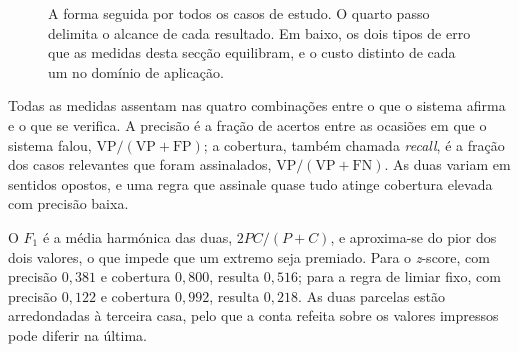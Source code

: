 \begin{figure}[htbp]
\centering
{}
\caption[A forma comum aos quatro casos de estudo]{A forma seguida por todos os casos de estudo. O
quarto passo delimita o alcance de cada resultado. Em baixo, os dois tipos de erro que as medidas
desta secção equilibram, e o custo distinto de cada um no domínio de aplicação.}
\label{fig:av_forma}
\end{figure}

Todas as medidas assentam nas quatro combinações entre o que o sistema afirma e o que se verifica.
A precisão é a fração de acertos entre as ocasiões em que o sistema falou,
$\mathrm{VP}/(\mathrm{VP}+\mathrm{FP})$; a cobertura, também chamada \emph{recall}, é a fração dos
casos relevantes que foram assinalados, $\mathrm{VP}/(\mathrm{VP}+\mathrm{FN})$. As duas variam em
sentidos opostos, e uma regra que assinale quase tudo atinge cobertura elevada com precisão baixa.

O $F_1$ é a média harmónica das duas, $2PC/(P+C)$, e aproxima-se do pior dos dois valores, o que
impede que um extremo seja premiado. Para o \emph{z}-score, com precisão $0{,}381$ e cobertura
$0{,}800$, resulta $0{,}516$; para a regra de limiar fixo, com precisão $0{,}122$ e cobertura
$0{,}992$, resulta $0{,}218$. As duas parcelas estão arredondadas à terceira casa, pelo que a
conta refeita sobre os valores impressos pode diferir na última.

